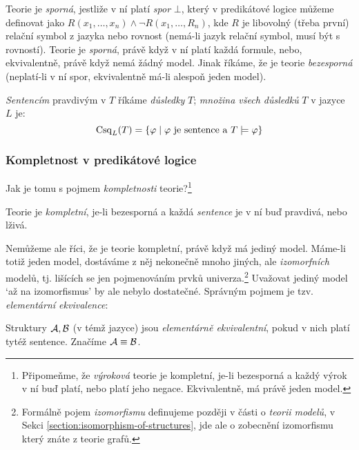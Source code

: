 Teorie je \emph{sporná}, jestliže v ní platí \emph{spor} $\bot$, který v predikátové logice můžeme definovat jako $R(x_1,\dots,x_n)\land \neg R(x_1,\dots,R_n)$, kde $R$ je libovolný (třeba první) relační symbol z jazyka nebo rovnost (nemá-li jazyk relační symbol, musí být s rovností). Teorie je \emph{sporná}, právě když v ní platí každá formule, nebo, ekvivalentně, právě když nemá žádný model. Jinak říkáme, že je teorie \emph{bezesporná} (neplatí-li v ní spor, ekvivalentně má-li alespoň jeden model).

\emph{Sentencím} pravdivým v $T$ říkáme \emph{důsledky} $T$; \emph{množina všech důsledků} $T$ v jazyce $L$ je:
$$
\operatorname{Csq}_L(T)=\{\varphi\mid\text{$\varphi$ je sentence a }T\models \varphi\}
$$

\subsubsection{Kompletnost v predikátové logice }
Jak je tomu s pojmem \emph{kompletnosti} teorie?\footnote{Připomeňme, že \emph{výroková} teorie je kompletní, je-li bezesporná a každý výrok v ní buď platí, nebo platí jeho negace. Ekvivalentně, má právě 
jeden model.}

\begin{definition}
    Teorie je \emph{kompletní}, je-li bezesporná a každá \emph{sentence} je v ní buď pravdivá, nebo lživá.
\end{definition}

Nemůžeme ale říci, že je teorie kompletní, právě když má jediný model. Máme-li totiž jeden model, dostáváme z něj nekonečně mnoho jiných, ale \emph{izomorfních} modelů, tj. lišících se jen pojmenováním prvků univerza.\footnote{Formálně pojem \emph{izomorfismu} definujeme později v části o \emph{teorii modelů}, v Sekci \ref{section:isomorphism-of-structures}, jde ale o zobecnění izomorfismu který znáte z teorie grafů.} Uvažovat jediný model `až na izomorfismus' by ale nebylo dostatečné. Správným pojmem je tzv. \emph{elementární ekvivalence}:

\begin{definition}
    Struktury $\mathcal{A},\mathcal{B}$ (v témž jazyce) jsou \emph{elementárně ekvivalentní}, pokud v nich platí tytéž sentence. Značíme $\mathcal{A}\equiv\mathcal{B}$.
\end{definition}

